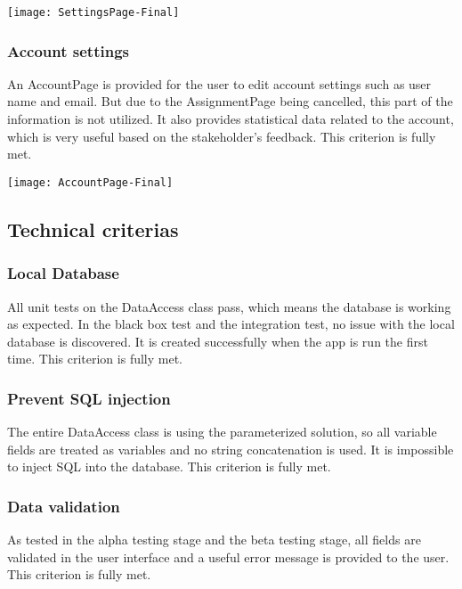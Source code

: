 \documentclass[report.tex]{subfiles}
\begin{document}
\texttt{[image: SettingsPage-Final]}

\subsubsection{Account settings}

An AccountPage is provided for the user to edit account settings such as user name and email. But due to the AssignmentPage being cancelled, this part of the information is not utilized. It also provides statistical data related to the account, which is very useful based on the stakeholder's feedback. This criterion is fully met.

\texttt{[image: AccountPage-Final]}

\subsection{Technical criterias}

\subsubsection{Local Database}

All unit tests on the DataAccess class pass, which means the database is working as expected. In the black box test and the integration test, no issue with the local database is discovered. It is created successfully when the app is run the first time. This criterion is fully met.

\subsubsection{Prevent SQL injection}

The entire DataAccess class is using the parameterized solution, so all variable fields are treated as variables and no string concatenation is used. It is impossible to inject SQL into the database. This criterion is fully met.

\subsubsection{Data validation}

As tested in the alpha testing stage and the beta testing stage, all fields are validated in the user interface and a useful error message is provided to the user. This criterion is fully met.
\end{document}
